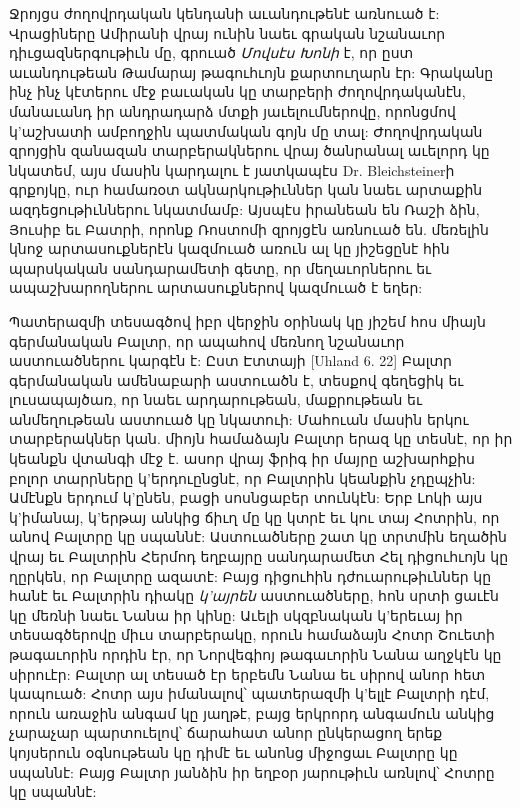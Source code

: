 \documentclass{article}
\begin{document}
{Ջրոյցս ժողովրդական կենդանի աւանդութենէ առնուած է: Վրացիները Ամիրանի վրայ ունին նաեւ գրական նշանաւոր դիւցազներգութիւն մը, գրուած \emph{Մովսէս Խոնի} է, որ ըստ աւանդութեան Թամարայ թագուհւոյն քարտուղարն էր: Գրականը ինչ ինչ կէտերու մէջ բաւական կը տարբերի ժողովրդականէն, մանաւանդ իր անդրադարձ մտքի յաւելումներովը, որոնցմով կ'աշխատի ամբողջին պատմական գոյն մը տալ: Ժողովրդական զրոյցին զանազան տարբերակներու վրայ ծանրանալ աւելորդ կը նկատեմ, այս մասին կարդալու է յատկապէս Dr. Bleichsteinerի գրքոյկը, ուր համառօտ ակնարկութիւններ կան նաեւ արտաքին ազդեցութիւններու նկատմամբ: Այսպէս իրանեան են Ռաշի ձին, Յուսիբ եւ Բատրի, որոնք Ռոստոմի զրոյցէն առնուած են. մեռելին կնոջ արտասուքներէն կազմուած առուն ալ կը յիշեցընէ հին պարսկական սանդարամետի գետը, որ մեղաւորներու եւ ապաշխարողներու արտասուքներով կազմուած է եղեր:

Պատերազմի տեսագծով իբր վերջին օրինակ կը յիշեմ հոս միայն գերմանական Բալտր, որ ապահով մեռնող նշանաւոր աստուածներու կարգէն է: Ըստ Էտտայի [Uhland 6. 22] Բալտր գերմանական ամենաբարի աստուածն է, տեսքով գեղեցիկ եւ լուսապայծառ, որ նաեւ արդարութեան, մաքրութեան եւ անմեղութեան աստուած կը նկատուի: Մահուան մասին երկու տարբերակներ կան. միոյն համաձայն Բալտր երազ կը տեսնէ, որ իր կեանքն վտանգի մէջ է. ասոր վրայ ֆրիգ իր մայրը աշխարհքիս բոլոր տարրները կ'երդուընցնէ, որ Բալտրին կեանքին չդըպչին: Ամէնքն երդում կ'ընեն, բացի սոսնցաբեր տունկէն: Երբ Լոկի այս կ'իմանայ, կ'երթայ անկից ճիւղ մը կը կտրէ եւ կու տայ Հոտրին, որ անով Բալտրը կը սպաննէ: Աստուածները շատ կը տրտմին եղածին վրայ եւ Բալտրին Հերմոդ եղբայրը սանդարամետ Հել դիցուհւոյն կը ղըրկեն, որ Բալտրը ազատէ: Բայց դիցուհին դժուարութիւններ կը հանէ եւ Բալտրին դիակը \emph{կ'այրեն} աստուածները, հոն սրտի ցաւէն կը մեռնի նաեւ Նանա իր կինը: Աւելի սկզբնական կ'երեւայ իր տեսագծերովը միւս տարբերակը, որուն համաձայն Հոտր Շուետի թագաւորին որդին էր, որ Նորվեգիոյ թագաւորին Նանա աղջկէն կը սիրուէր: Բալտր ալ տեսած էր երբեմն Նանա եւ սիրով անոր հետ կապուած: Հոտր այս իմանալով՝ պատերազմի կ'ելլէ Բալտրի դէմ, որուն առաջին անգամ կը յաղթէ, բայց երկրորդ անգամուն անկից չարաչար պարտուելով՝ ճարահատ անոր ընկերացող երեք կոյսերուն օգնութեան կը դիմէ եւ անոնց միջոցաւ Բալտրը կը սպաննէ: Բայց Բալտր յանձին իր եղբօր յարութիւն առնլով՝ Հոտրը կը սպաննէ:}
\clearpage
\subsection{}
\end{document}
